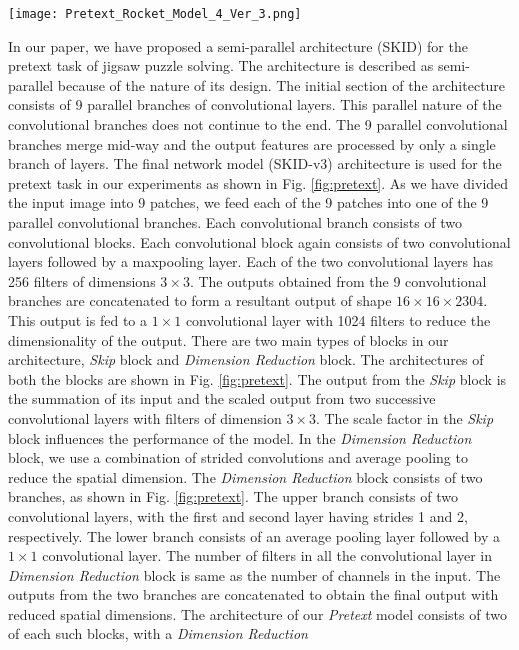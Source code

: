 \documentclass[journal]{IEEEtai}
\begin{document}
\begin{figure*}[ht]
\begin{minipage}{\textwidth}
    \centering
    \texttt{[image: Pretext\_Rocket\_Model\_4\_Ver\_3.png]}
    \caption{Proposed model for pretext task.  The model architecture contains three types of blocks: (a) Convolutional, (b) Dimension Reduction and (c) Skip. These three blocks are presented in expanded view above the model diagram and marked as (a), (b) and (c). The pretext model architecture is shown in (d). The image is best visible in 200\% scale.}
    \label{fig:pretext}
\end{minipage}
\end{figure*}


\indent In our paper, we have proposed a semi-parallel architecture (SKID) for the pretext task of jigsaw puzzle solving. The architecture is described as semi-parallel because of the nature of its design. The initial section of the architecture consists of 9 parallel branches of convolutional layers. This parallel nature of the convolutional branches does not continue to the end. The 9 parallel convolutional branches merge mid-way and the output features are processed by only a single branch of layers. The final network model (SKID-v3) architecture is used for the pretext task in our experiments as shown in Fig. \ref{fig:pretext}. As we have divided the input image into 9 patches, we feed each of the 9 patches into one of the 9 parallel convolutional branches. Each convolutional branch consists of two convolutional blocks. Each convolutional block again consists of two convolutional layers followed by a maxpooling layer. Each of the two convolutional layers has 256 filters of dimensions $3 \times 3$. The outputs obtained from the 9 convolutional branches are concatenated to form a resultant output of shape $16 \times 16 \times 2304$. This output is fed to a $1 \times 1$ convolutional layer with 1024 filters to reduce the dimensionality of the output. There are two main types of blocks in our architecture, \textit{Skip} block and \textit{Dimension Reduction} block. The architectures of both the blocks are shown in Fig. \ref{fig:pretext}. The output from the \textit{Skip} block is the summation of its input and the scaled output from two successive convolutional layers with filters of dimension $3 \times 3$. The scale factor in the \textit{Skip} block influences the performance of the model. In the \textit{Dimension Reduction} block, we use a combination of strided convolutions and average pooling to reduce the spatial dimension. The \textit{Dimension Reduction} block consists of two branches, as shown in Fig. \ref{fig:pretext}. The upper branch consists of two convolutional layers, with the first and second layer having strides 1 and 2, respectively. The lower branch consists of an average pooling layer followed by a $1 \times 1$ convolutional layer. The number of filters in all the convolutional layer in \textit{Dimension Reduction} block is same as the number of channels in the input. The outputs from the two branches are concatenated to obtain the final output with reduced spatial dimensions. The architecture of our \textit{Pretext} model consists of two of each such blocks, with a \textit{Dimension Reduction} 
\end{document}
